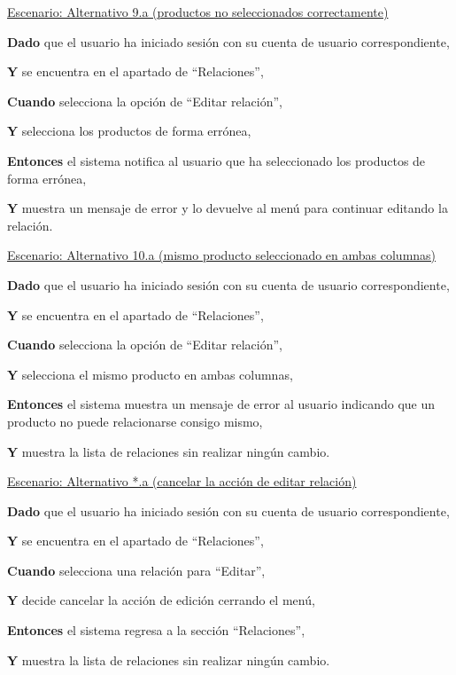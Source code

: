 \underline{Escenario: Alternativo 9.a (productos no seleccionados correctamente)}\par
\vspace{0.15cm}

\textbf{Dado} que el usuario ha iniciado sesión con su cuenta de usuario correspondiente,\par
\textbf{Y} se encuentra en el apartado de \enquote{Relaciones},\par
\textbf{Cuando} selecciona la opción de \enquote{Editar relación},\par
\textbf{Y} selecciona los productos de forma errónea,\par
\textbf{Entonces} el sistema notifica al usuario que ha seleccionado los productos de forma errónea,\par
\textbf{Y} muestra un mensaje de error y lo devuelve al menú para continuar editando la relación.\par

\vspace{0.20cm}

\underline{Escenario: Alternativo 10.a (mismo producto seleccionado en ambas columnas)}\par
\vspace{0.15cm}

\textbf{Dado} que el usuario ha iniciado sesión con su cuenta de usuario correspondiente,\par
\textbf{Y} se encuentra en el apartado de \enquote{Relaciones},\par
\textbf{Cuando} selecciona la opción de \enquote{Editar relación},\par
\textbf{Y} selecciona el mismo producto en ambas columnas,\par
\textbf{Entonces} el sistema muestra un mensaje de error al usuario indicando que un producto no puede relacionarse consigo mismo,\par
\textbf{Y} muestra la lista de relaciones sin realizar ningún cambio.\par

\vspace{0.20cm}

\underline{Escenario: Alternativo *.a (cancelar la acción de editar relación)}\par
\vspace{0.15cm}
\textbf{Dado} que el usuario ha iniciado sesión con su cuenta de usuario correspondiente,\par
\textbf{Y} se encuentra en el apartado de \enquote{Relaciones},\par
\textbf{Cuando} selecciona una relación para \enquote{Editar},\par
\textbf{Y} decide cancelar la acción de edición cerrando el menú,\par
\textbf{Entonces} el sistema regresa a la sección \enquote{Relaciones},\par
\textbf{Y} muestra la lista de relaciones sin realizar ningún cambio.\par


